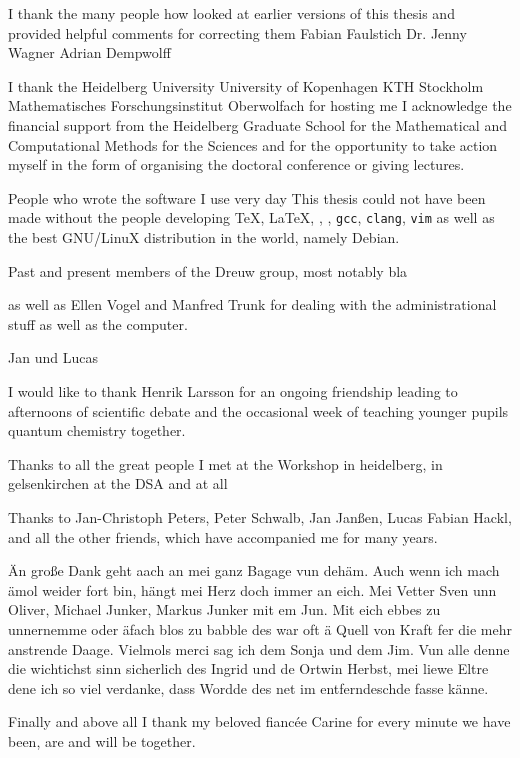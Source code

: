 I thank the many people how looked at earlier versions
of this thesis and provided helpful comments for correcting them
Fabian Faulstich
Dr. Jenny Wagner
Adrian Dempwolff

I thank the 
Heidelberg University
University of Kopenhagen
KTH Stockholm
Mathematisches Forschungsinstitut Oberwolfach
for hosting me
I acknowledge the
financial support from the Heidelberg Graduate School
for the Mathematical and Computational Methods for the Sciences
and for the opportunity to take action myself
in the form of organising
the doctoral conference or giving lectures.

People who wrote the software I use very day
This thesis could not have been made without the people
developing \TeX, \LaTeX, \python, \numpy, \texttt{gcc}, \texttt{clang}, \texttt{vim}
as well as the best GNU/LinuX distribution in the world,
namely Debian.

Past and present members of the Dreuw group,
most notably bla

as well as Ellen Vogel and Manfred Trunk for dealing with the
administrational stuff as well as the computer.

Jan und Lucas

I would like to thank Henrik Larsson
for an ongoing friendship leading to afternoons of scientific
debate
and the occasional week of teaching younger pupils
quantum chemistry together.

Thanks to all the great people I met
at the Workshop in heidelberg,
in gelsenkirchen
at the DSA and at all 

Thanks to Jan-Christoph Peters, Peter Schwalb,
Jan Janßen, Lucas Fabian Hackl,
and all the other friends, which have accompanied me for many years.


Än große Dank geht aach an mei ganz Bagage vun dehäm.
Auch wenn ich  mach ämol weider fort bin,
hängt mei Herz doch immer an eich.
Mei Vetter Sven unn Oliver,
Michael Junker, Markus Junker mit em Jun.
Mit eich ebbes zu unnernemme oder äfach blos zu babble
des war oft ä Quell von Kraft fer die mehr anstrende Daage.
Vielmols merci sag ich dem Sonja und dem Jim.
Vun alle denne die wichtichst
sinn sicherlich des Ingrid und de Ortwin Herbst,
mei liewe Eltre dene ich so viel verdanke,
dass Wordde des net im entferndeschde fasse känne.

Finally and above all I thank my beloved fianc\'ee Carine
for every minute we have been, are and will be together.
